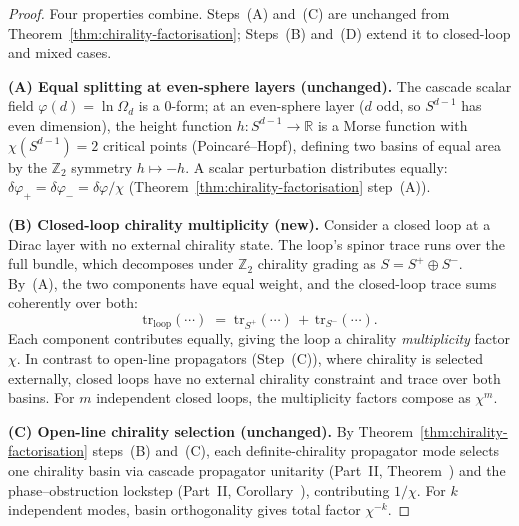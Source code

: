 \documentclass[12pt,a4paper]{article}
\begin{document}
\begin{proof}
Four properties combine. Steps~(A) and~(C) are unchanged from Theorem~\ref{thm:chirality-factorisation}; Steps~(B) and~(D) extend it to closed-loop and mixed cases.

\textbf{(A) Equal splitting at even-sphere layers (unchanged).} The cascade scalar field $\varphi(d) = \ln\Omega_d$ is a $0$-form; at an even-sphere layer ($d$ odd, so $S^{d-1}$ has even dimension), the height function $h:S^{d-1}\to\mathbb{R}$ is a Morse function with $\chi(S^{d-1}) = 2$ critical points (Poincar\'e--Hopf), defining two basins of equal area by the $\mathbb{Z}_2$ symmetry $h\mapsto -h$. A scalar perturbation distributes equally: $\delta\varphi_+ = \delta\varphi_- = \delta\varphi/\chi$ (Theorem~\ref{thm:chirality-factorisation} step~(A)).

\textbf{(B) Closed-loop chirality multiplicity (new).} Consider a closed loop at a Dirac layer with no external chirality state. The loop's spinor trace runs over the full bundle, which decomposes under $\mathbb{Z}_2$ chirality grading as $S = S^+ \oplus S^-$. By~(A), the two components have equal weight, and the closed-loop trace sums coherently over both:
\[
\mathrm{tr}_{\text{loop}}(\cdots) \;=\; \mathrm{tr}_{S^+}(\cdots) \,+\, \mathrm{tr}_{S^-}(\cdots).
\]
Each component contributes equally, giving the loop a chirality \emph{multiplicity} factor $\chi$. In contrast to open-line propagators (Step~(C)), where chirality is selected externally, closed loops have no external chirality constraint and trace over both basins. For $m$ independent closed loops, the multiplicity factors compose as $\chi^m$.

\textbf{(C) Open-line chirality selection (unchanged).} By Theorem~\ref{thm:chirality-factorisation} steps~(B) and~(C), each definite-chirality propagator mode selects one chirality basin via cascade propagator unitarity (Part~II, Theorem~) and the phase--obstruction lockstep (Part~II, Corollary~), contributing $1/\chi$. For $k$ independent modes, basin orthogonality gives total factor $\chi^{-k}$.


\end{proof}
\end{document}
